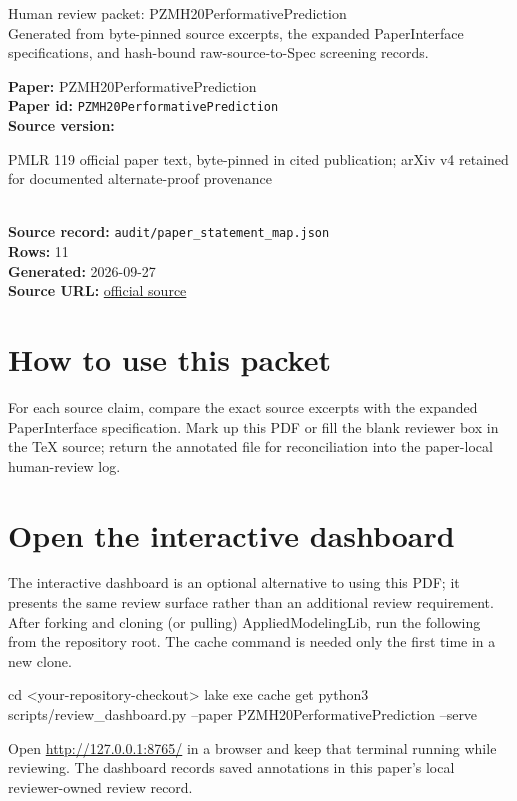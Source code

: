 \documentclass[10pt]{article}
\begin{document}
\fontsize{9}{10}\selectfont

\begin{center}
{\LARGE Human review packet: PZMH20PerformativePrediction}\\[0.35em]
\small Generated from byte-pinned source excerpts, the expanded PaperInterface
specifications, and hash-bound raw-source-to-Spec screening records.
\end{center}

\noindent\textbf{Paper:} PZMH20PerformativePrediction\\
\textbf{Paper id:} \texttt{PZMH20PerformativePrediction}\\
\textbf{Source version:} \parbox[t]{0.76\linewidth}{\raggedright PMLR 119 official paper text, byte-pinned in cited publication; arXiv v4 retained for documented alternate-proof provenance}\\
\textbf{Source record:} \texttt{audit/paper\_statement\_map.json}\\
\textbf{Rows:} 11\\
\textbf{Generated:} 2026-09-27\\
\textbf{Source URL:} \href{https://proceedings.mlr.press/v119/perdomo20a.html}{official source}





\section*{How to use this packet}
For each source claim, compare the exact source excerpts with the expanded
PaperInterface specification. Mark up this PDF or fill the blank reviewer box in the TeX source;
return the annotated file for reconciliation into the paper-local human-review
log.

\section*{Open the interactive dashboard}
The interactive dashboard is an optional alternative to using this PDF; it
presents the same review surface rather than an additional review requirement.
After forking and cloning (or pulling) AppliedModelingLib, run the following from the
repository root. The cache command is needed only the first time in a new clone.
\begin{ReviewVerbatim}
cd <your-repository-checkout>
lake exe cache get
python3 scripts/review_dashboard.py --paper PZMH20PerformativePrediction --serve
\end{ReviewVerbatim}
Open \url{http://127.0.0.1:8765/} in a browser and keep that terminal running
while reviewing. The dashboard records saved annotations in this paper's local
reviewer-owned review record.
\end{document}

